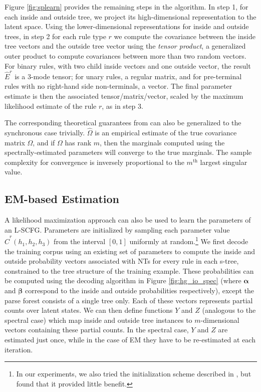 \documentclass[11pt]{article}
\newcommand{\e}[1]{\hat{#1}}
\newcommand{\balpha}{\bm{\alpha}}
\newcommand{\bbeta}{\bm{\beta}}
\begin{document}
Figure \ref{fig:splearn} provides the remaining steps in the algorithm.  
In step 1, for each inside and outside tree, we project its high-dimensional representation to the latent space.  
Using the lower-dimensional representations for inside and outside trees, in step 2 for each rule type $r$ we compute the covariance between the inside tree vectors and the outside tree vector using the \emph{tensor product}, a generalized outer product to compute covariances between more than two random vectors.  
For binary rules, with two child inside vectors and one outside vector, the result $\e{E}^r$ is a 3-mode tensor; for unary rules, a regular matrix, and for pre-terminal rules with no right-hand side non-terminals, a vector. 
The final parameter estimate is then the associated tensor/matrix/vector, scaled by the maximum likelihood estimate of the rule $r$, as in step 3.  

The corresponding theoretical guarantees from  can also be generalized to the synchronous case trivially.  
$\hat{\Omega}$ is an empirical estimate of the true covariance matrix $\Omega$, and if $\Omega$ has rank $m$, then the marginals computed using the spectrally-estimated parameters will converge to the true marginals.  
The sample complexity for convergence is inversely proportional to the $m^{\textrm{th}}$ largest singular value.   

\subsection{EM-based Estimation}
\label{sec:em}
A likelihood maximization approach can also be used to learn the parameters of an L-SCFG.  
Parameters are initialized by sampling each parameter value $\e{C}^r(h_1, h_2, h_3)$ from the interval $[0,1]$ uniformly at random.\footnote{In our experiments, we also tried the initialization scheme described in , but found that it provided little benefit.}
We first decode the training corpus using an existing set of parameters to compute the inside and outside probability vectors associated with NTs for every rule in each s-tree, constrained to the tree structure of the training example. 
These probabilities can be computed using the decoding algorithm in Figure \ref{fig:hg_io_spec} (where $\balpha$ and $\bbeta$ correspond to the inside and outside probabilities respectively), except the parse forest consists of a single tree only. 
Each of these vectors represents partial counts over latent states.  
We can then define functions $Y$ and $Z$ (analogous to the spectral case) which map inside and outside tree instances to $m$-dimensional vectors containing these partial counts. 
In the spectral case, $Y$ and $Z$ are estimated just once, while in the case of EM they have to be re-estimated at each iteration.
\end{document}
